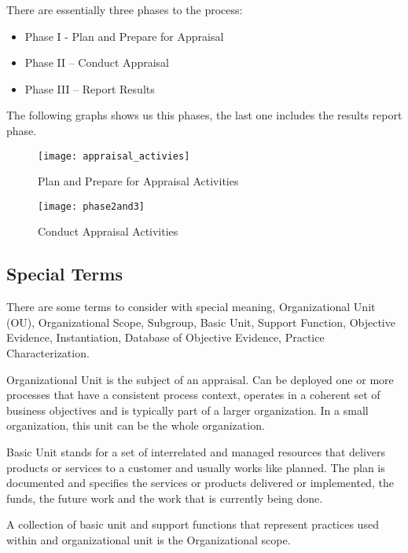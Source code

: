 There are essentially three phases to the process:
\begin{itemize}
	\item Phase I - Plan and Prepare for Appraisal 
	\item Phase II – Conduct Appraisal
	\item Phase III – Report Results
\end{itemize}

The following graphs shows us this phases, the last one includes the results report phase.

\begin{figure}[h]
	\begin{center}
		\leavevmode
		\texttt{[image: appraisal\_activies]}
		\caption{Plan and Prepare for Appraisal Activities}
		\label{fig:plan_appraisal}
	\end{center}
\end{figure}


\begin{figure}[h]
	\begin{center}
		\leavevmode
		\texttt{[image: phase2and3]}
		\caption{Conduct Appraisal Activities}
		\label{fig:results_appraisal}
	\end{center}
\end{figure}

\subsection{Special Terms}
There are some terms to consider with special meaning, Organizational Unit (OU), Organizational Scope, Subgroup, Basic Unit, Support Function, Objective Evidence, Instantiation, Database of Objective Evidence, Practice Characterization.

Organizational Unit is the subject of an appraisal. Can be deployed one or more processes that have a consistent process context, operates in a coherent set of business objectives and is typically part of a larger organization. In a small organization, this unit can be the whole organization.

Basic Unit stands for a set of interrelated and managed resources that delivers products or services to a customer and usually works like planned. The plan is documented and specifies the services or products delivered or implemented, the funds, the future work and the work that is currently being done.

A collection of basic unit and support functions that represent practices used within and organizational unit is the Organizational scope.


